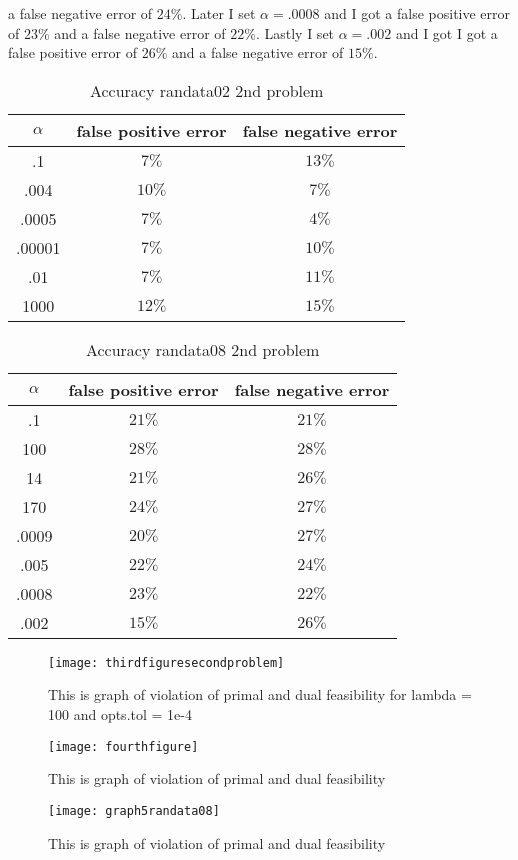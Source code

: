 \documentclass[11pt]{article}
\begin{document}
a 
false negative error of $24\%$. Later I set $\alpha = .0008$ and I got a false positive error of $23\%$ 
and 
a false negative error of $22\%$. Lastly I set $\alpha = .002$ and I got I got a false positive error of 
$26\%$ and a false negative error of $15\%$.
\bigskip
\begin{table}[ht]
\caption{Accuracy randata02 2nd problem}
\centering 
\begin{tabular}{c c c} 
\hline\hline 
$\alpha$  & false positive error & false negative error\\ [0.5ex]
\hline
.1 & $7\%$ & $13\%$ \\
.004 & $10\%$ & $7\%$ \\
.0005 & $7\%$ & $4\%$ \\
.00001 & $7\%$ & $10\%$ \\
.01 & $7\%$ & $11\%$ \\
1000 & $12\%$ & $15\%$ \\
\hline 
\end{tabular}
\end{table}
\begin{table}[ht]
\caption{Accuracy randata08 2nd problem}
\centering 
\begin{tabular}{c c c} 
\hline\hline 
$\alpha$  & false positive error & false negative error \\ [0.5ex]
\hline
.1 & $21\%$ & $21\%$ \\
100 & $28\%$ & $28\%$ \\
14 & $21\%$ & $26\%$ \\
170 & $24\%$ & $27\%$ \\
.0009 & $20\%$ & $27\%$ \\
.005 & $22\%$ & $24\%$ \\
.0008 & $23\%$ & $22\%$ \\
.002 & $15\%$ & $26\%$ \\
\hline 
\end{tabular}
\end{table}
\bigskip
\begin{figure}
    \centering
    \texttt{[image: thirdfiguresecondproblem]}
    \caption{This is graph of violation of primal and dual feasibility for lambda = 100 and opts.tol = 
    1e-4}
\end{figure}
\begin{figure}
    \centering
    \texttt{[image: fourthfigure]}
    \caption{This is graph of violation of primal and dual feasibility}
\end{figure}
\begin{figure}
    \centering
    \texttt{[image: graph5randata08]}
    \caption{This is graph of violation of primal and dual feasibility}
\end{figure}
\end{document}
